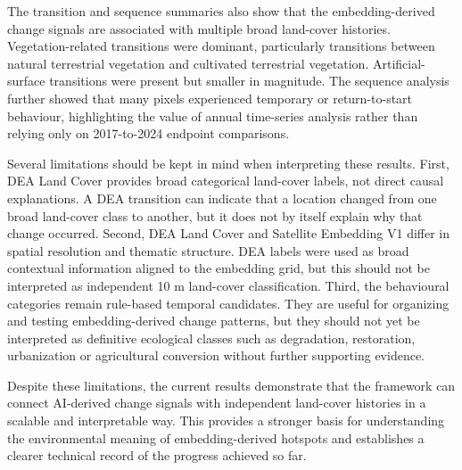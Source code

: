 \documentclass[11pt,a4paper]{article}
\begin{document}
The transition and sequence summaries also show that the embedding-derived change signals are associated with multiple broad land-cover histories. Vegetation-related transitions were dominant, particularly transitions between natural terrestrial vegetation and cultivated terrestrial vegetation. Artificial-surface transitions were present but smaller in magnitude. The sequence analysis further showed that many pixels experienced temporary or return-to-start behaviour, highlighting the value of annual time-series analysis rather than relying only on 2017-to-2024 endpoint comparisons.

Several limitations should be kept in mind when interpreting these results. First, DEA Land Cover provides broad categorical land-cover labels, not direct causal explanations. A DEA transition can indicate that a location changed from one broad land-cover class to another, but it does not by itself explain why that change occurred. Second, DEA Land Cover and Satellite Embedding V1 differ in spatial resolution and thematic structure. DEA labels were used as broad contextual information aligned to the embedding grid, but this should not be interpreted as independent 10 m land-cover classification. Third, the behavioural categories remain rule-based temporal candidates. They are useful for organizing and testing embedding-derived change patterns, but they should not yet be interpreted as definitive ecological classes such as degradation, restoration, urbanization or agricultural conversion without further supporting evidence.

Despite these limitations, the current results demonstrate that the framework can connect AI-derived change signals with independent land-cover histories in a scalable and interpretable way. This provides a stronger basis for understanding the environmental meaning of embedding-derived hotspots and establishes a clearer technical record of the progress achieved so far.
\end{document}
